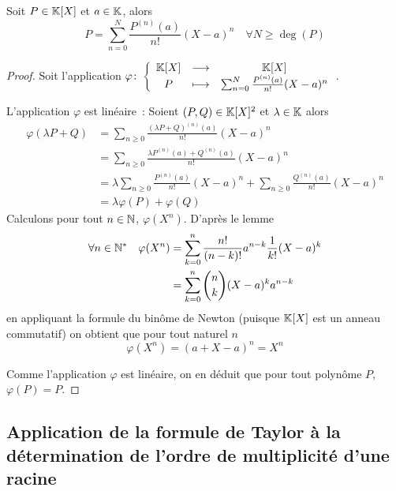 \begin{theo}
  Soit \(P \in \mathbb{K}[X]\) et \(a \in \mathbb{K}\), alors
  \begin{equation}
    P = \sum_{n = 0}^N \frac{P^{(n)}(a)}{n!} (X-a)^n \quad \forall N \geqslant 
    \deg(P)
  \end{equation}
\end{theo}
\begin{proof}
  Soit l'application \(\varphi\colon\left\{\begin{array}{ccc}\mathbb{K}[X] & \longrightarrow &\mathbb{K}[X]\\P & \longmapsto & \sum_{n = 0}^N 
  \frac{P^{(n)}(a)}{n!} (X-a)^n\end{array}\right.\).

  L'application \(\varphi\) est linéaire~: Soient \((P,Q) \in \mathbb{K}[X]^2\) et 
  \(\lambda \in \mathbb{K}\) alors
  \begin{align}
    \varphi(\lambda P +Q) &= \sum_{n \geqslant 0} \frac{(\lambda 
    P+Q)^{(n)}(a)}{n!}(X-a)^n\\
    &= \sum_{n \geqslant 0} \frac{\lambda P^{(n)}(a) +Q^{(n)}(a)}{n!}(X-a)^n\\
    &= \lambda \sum_{n \geqslant 0} \frac{P^{(n)}(a)}{n!}(X-a)^n + \sum_{n 
    \geqslant 0} \frac{Q^{(n)}(a)}{n!}(X-a)^n \\
    &= \lambda\varphi(P) +\varphi(Q)
  \end{align}
  Calculons pour tout \(n \in \mathbb{N}\), \(\varphi(X^n)\). D'après le lemme
  \begin{align}
    \forall n \in \mathbb{N}^* \quad \varphi(X^n) &= \sum_{k = 0}^n \frac{n!}{(n-k)!} 
    a^{n-k} \frac{1}{k!}(X-a)^k\\
    &= \sum_{k = 0}^n \binom{n}{k} (X-a)^k a^{n-k}
  \end{align}
  en appliquant la formule du binôme de Newton (puisque \(\mathbb{K}[X]\) est un anneau 
  commutatif) on obtient que pour tout naturel \(n\)
  \begin{equation}
    \varphi(X^n) = (a+X-a)^n = X^n
  \end{equation}

  Comme l'application \(\varphi\) est linéaire, on en déduit que pour tout 
  polynôme \(P\), \(\varphi(P) = P\).
\end{proof}

\subsection{Application de la formule de Taylor à la détermination de l'ordre de 
multiplicité  d'une racine}

